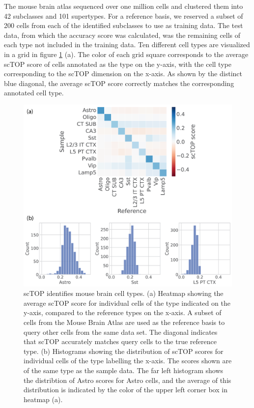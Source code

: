 \documentclass[aps,superscriptaddress, notitlepage,longbibliography]{revtex4-1}
\begin{document}
The mouse brain atlas\cite{yao_taxonomy_2021} sequenced over one million cells and clustered them into 42 subclasses and 101 supertypes. For a reference basis, we reserved a subset of 200 cells from each of the identified subclasses to use as training data. The test data, from which the accuracy score was calculated, was the remaining cells of each type not included in the training data. Ten different cell types are visualized in a grid in figure \ref{mouse_brain} (a). The color of each grid square corresponds to the average scTOP score of cells annotated as the type on the y-axis, with the cell type corresponding to the scTOP dimension on the x-axis. As shown by the distinct blue diagonal, the average scTOP score correctly matches the corresponding annotated cell type.

\begin{figure}
	\centering
    \includegraphics[scale=0.75]{figs/mouse brain.png}
	\caption{scTOP identifies mouse brain cell types. (a) Heatmap showing the average scTOP score for individual cells of the type indicated on the y-axis, compared to the reference types on the x-axis. A subset of cells from the Mouse Brain Atlas are used as the reference basis to query other cells from the same data set. The diagonal indicates that scTOP accurately matches query cells to the true reference type. (b) Histograms showing the distribution of scTOP scores for individual cells of the type labelling the x-axis. The scores shown are of the same type as the sample data. The far left histogram shows the distribtion of Astro scores for Astro cells, and the average of this distribution is indicated by the color of the upper left corner box in heatmap (a).}
	\label{mouse_brain}
\end{figure}
\end{document}
